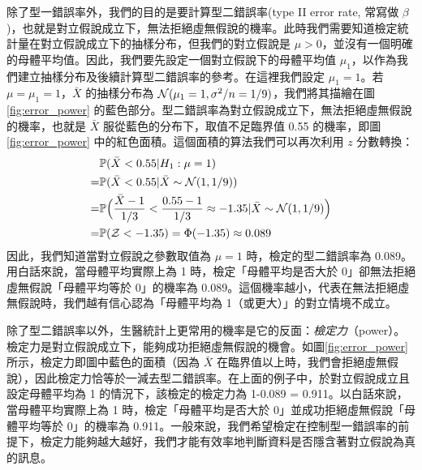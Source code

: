    除了型一錯誤率外，我們的目的是要計算型二錯誤率(type II error rate, 常寫做 $\beta$)，也就是對立假說成立下，無法拒絕虛無假說的機率。此時我們需要知道檢定統計量在對立假說成立下的抽樣分布，但我們的對立假說是 $\mu > 0$，並沒有一個明確的母體平均值。因此，我們要先設定一個對立假說下的母體平均值 $\mu_1$，以作為我們建立抽樣分布及後續計算型二錯誤率的參考。在這裡我們設定 $\mu_1 = 1$。若 $\mu = \mu_1 = 1$，$\bar{X}$ 的抽樣分布為 $\mathcal{N}(\mu_1 = 1, \sigma^2/n = 1/9)$，我們將其描繪在圖 \ref{fig:error_power} 的藍色部分。型二錯誤率為對立假說成立下，無法拒絕虛無假說的機率，也就是 $\bar{X}$ 服從藍色的分布下，取值不足臨界值 0.55 的機率，即圖 \ref{fig:error_power} 中的紅色面積。這個面積的算法我們可以再次利用 $z$ 分數轉換：
    \smallskip
    \begin{align*}
        &\mathbb{P}(\bar{X} < 0.55|H_1:\mu = 1) \\
        =& \mathbb{P}(\bar{X} < 0.55|\bar{X} \sim \mathcal{N}(1, 1/9))\\
        =& \mathbb{P}\Big(\frac{\bar{X}-1}{1/3} < \frac{0.55 - 1}{1/3} \approx -1.35|\bar{X} \sim \mathcal{N}(1, 1/9)\Big)\\
        =& \mathbb{P}(\mathcal{Z} < -1.35) = \Phi(-1.35) \approx 0.089
    \end{align*}
    \smallskip
    因此，我們知道當對立假說之參數取值為 $\mu = 1$ 時，檢定的型二錯誤率為 0.089。用白話來說，當母體平均實際上為 1 時，檢定「母體平均是否大於 0」卻無法拒絕虛無假說「母體平均等於 0」的機率為 0.089。這個機率越小，代表在無法拒絕虛無假說時，我們越有信心認為「母體平均為 1（或更大）」的對立情境不成立。

    \medskip

    除了型二錯誤率以外，生醫統計上更常用的機率是它的反面：\textit{檢定力}（power）。檢定力是對立假說成立下，能夠成功拒絕虛無假說的機會。如圖\ref{fig:error_power}所示，檢定力即圖中藍色的面積（因為 $\bar{X}$ 在臨界值以上時，我們會拒絕虛無假說），因此檢定力恰等於一減去型二錯誤率。在上面的例子中，於對立假說成立且設定母體平均為 1 的情況下，該檢定的檢定力為 1-0.089 = 0.911。以白話來說，當母體平均實際上為 1 時，檢定「母體平均是否大於 0」並成功拒絕虛無假說「母體平均等於 0」的機率為 0.911。一般來說，我們希望檢定在控制型一錯誤率的前提下，檢定力能夠越大越好，我們才能有效率地判斷資料是否隱含著對立假說為真的訊息。

    \medskip
    
